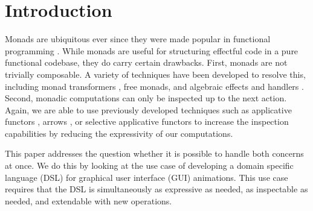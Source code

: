 \section{Introduction}
\label{sec:intro}

Monads are ubiquitous ever since they were made popular in functional programming \cite{DBLP:conf/lfp/Wadler90}. While monads are useful for structuring effectful code in a pure functional codebase, they do carry certain drawbacks. First, monads are not trivially composable. A variety of techniques have been developed to resolve this, including monad transformers \cite{DBLP:conf/popl/LiangHJ95}, free monads, and algebraic effects and handlers \cite{DBLP:conf/esop/PlotkinP09}. Second, monadic computations can only be inspected up to the next action. Again, we are able to use previously developed techniques such as applicative functors \cite{DBLP:journals/jfp/McbrideP08}, arrows \cite{DBLP:journals/scp/Hughes00}, or selective applicative functors to increase the inspection capabilities by reducing the expressivity of our computations.

This paper addresses the question whether it is possible to handle both concerns at once. We do this by looking at the use case of developing a domain specific language (DSL) for graphical user interface (GUI) animations. This use case requires that the DSL is simultaneously as expressive as needed, as inspectable as needed, and extendable with new operations.
